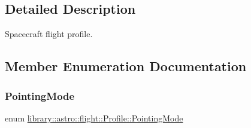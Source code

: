 \subsection{Detailed Description}
Spacecraft flight profile. 

\subsection{Member Enumeration Documentation}
\mbox{\label{classlibrary_1_1astro_1_1flight_1_1_profile_a67798efdc3ae7a731d57c0ad053d1cae}} 
\subsubsection{\texorpdfstring{Pointing\+Mode}{PointingMode}}
{\footnotesize\ttfamily enum \hyperlink{classlibrary_1_1astro_1_1flight_1_1_profile_a67798efdc3ae7a731d57c0ad053d1cae}{library\+::astro\+::flight\+::\+Profile\+::\+Pointing\+Mode}\hspace{0.3cm}{\ttfamily [strong]}}

